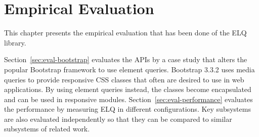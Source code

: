 \documentclass[a4paper,11pt]{kth-mag}
\begin{document}
  \chapter{Empirical Evaluation}
    This chapter presents the empirical evaluation that has been done of the \gls{ELQ} library.

    Section~\ref{sec:eval-bootstrap} evaluates the \glspl{API} by a case study that alters the popular \gls{Bootstrap} framework to use element queries.
    \gls{Bootstrap} 3.3.2 uses media queries to provide responsive \gls{CSS} classes that often are desired to use in web applications.
    By using element queries instead, the classes become encapsulated and can be used in responsive modules.
    Section~\ref{sec:eval-performance} evaluates the performance by measuring \gls{ELQ} in different configurations.
    Key subsystems are also evaluated independently so that they can be compared to similar subsystems of related work.

\end{document}
